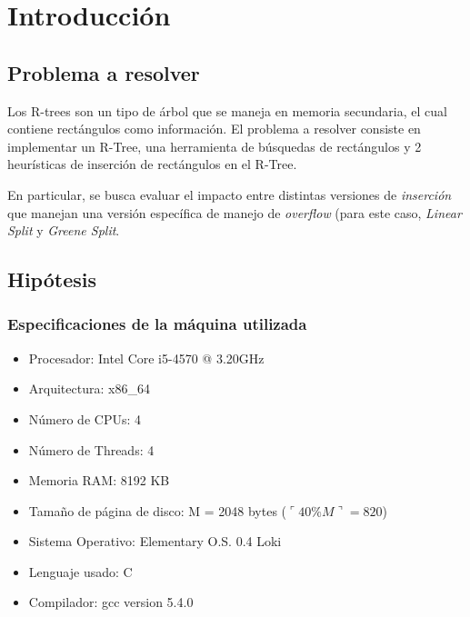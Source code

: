 \documentclass[letterpaper,10pt]{article}
\begin{document}
	\newpage

	\section{Introducción}

	\subsection{Problema a resolver}

	Los R-trees son un tipo de árbol que se maneja en memoria secundaria, el cual contiene rectángulos como información. El problema a resolver consiste en implementar un R-Tree,
	una herramienta de búsquedas de rectángulos y 2 heurísticas de inserción de rectángulos en el R-Tree.

	En particular, se busca evaluar el impacto entre distintas versiones de \textit{inserción} que manejan una versión específica de manejo de \textit{overflow} (para este caso,
	\textit{Linear Split} y \textit{Greene Split}.

	\subsection{Hipótesis}

	\subsubsection*{Especificaciones de la máquina utilizada}

	\begin{itemize}
		\item Procesador: Intel \textregistered Core \textregistered i5-4570 @ 3.20GHz
		\item Arquitectura: x86\_64
		\item Número de CPUs: 4
		\item Número de Threads: 4
		\item Memoria RAM: 8192 KB
		\item Tamaño de página de disco: M = 2048 bytes ($\ulcorner40\% M\urcorner = 820$)
		\item Sistema Operativo: Elementary O.S. 0.4 Loki
		\item Lenguaje usado: C
		\item Compilador: gcc version 5.4.0
	\end{itemize}
\end{document}
